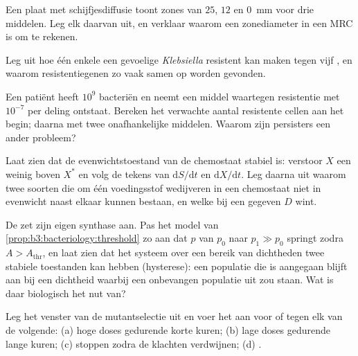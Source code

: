\begin{exercise}[$\star\star$]\label{exo:b3:bacteriology:7}
Een plaat met schijfjesdiffusie toont zones van $25$, $12$ en
\qty{0}{mm} voor drie middelen. Leg elk daarvan uit, en verklaar waarom
een zonediameter in een MRC is om te rekenen.
\end{exercise}

\begin{exercise}[$\star\star$]\label{exo:b3:bacteriology:8}
Leg uit hoe één enkele  een gevoelige \emph{Klebsiella}
resistent kan maken tegen vijf , en waarom
resistentiegenen zo vaak samen op  worden gevonden.
\end{exercise}

\begin{exercise}[$\star\star$]\label{exo:b3:bacteriology:9}
Een patiënt heeft $10^{9}$ bacteriën en neemt een middel waartegen
resistentie met $10^{-7}$ per deling ontstaat. Bereken het verwachte
aantal resistente cellen aan het begin; daarna met twee onafhankelijke
middelen. Waarom zijn persisters een ander probleem?
\end{exercise}

\begin{exercise}[$\star\star\star$]\label{exo:b3:bacteriology:10}
Laat zien dat de evenwichtstoestand van de chemostaat stabiel is:
verstoor $X$ een weinig boven $X^{*}$ en volg de tekens van
$\mathrm{d}S/\mathrm{d}t$ en $\mathrm{d}X/\mathrm{d}t$. Leg daarna uit
waarom twee soorten die om één voedingsstof wedijveren in een
chemostaat niet in evenwicht naast elkaar kunnen bestaan, en welke bij
een gegeven $D$ wint.
\end{exercise}

\begin{exercise}[$\star\star\star$]\label{exo:b3:bacteriology:11}
De  zet zijn eigen synthase aan. Pas het model van
\cref{prop:b3:bacteriology:threshold} zo aan dat $p$ van $p_{0}$ naar
$p_{1} \gg p_{0}$ springt zodra $A > A_{\text{thr}}$, en laat zien dat
het systeem over een bereik van dichtheden twee stabiele toestanden kan
hebben (hysterese): een populatie die is aangegaan blijft aan bij een
dichtheid waarbij een onbevangen populatie uit zou staan. Wat is daar
biologisch het nut van?
\end{exercise}

\begin{exercise}[$\star\star\star$]\label{exo:b3:bacteriology:12}
Leg het venster van de mutantselectie uit en voer het aan voor of tegen
elk van de volgende: (a) hoge doses gedurende korte kuren; (b) lage
doses gedurende lange kuren; (c) stoppen zodra de klachten verdwijnen;
(d) .
\end{exercise}

